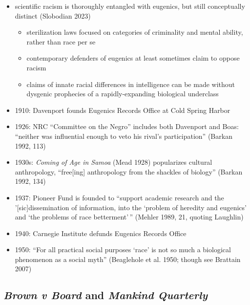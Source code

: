 \documentclass[12pt]{article}
\providecommand{\tightlist}{%
  \setlength{\itemsep}{0pt}\setlength{\parskip}{0pt}}
\begin{document}
\begin{itemize}
\tightlist
\item
  scientific racism is thoroughly entangled with eugenics, but still
  conceptually distinct (Slobodian 2023)

  \begin{itemize}
  \tightlist
  \item
    sterilization laws focused on categories of criminality and mental
    ability, rather than race per se
  \item
    contemporary defenders of eugenics at least sometimes claim to
    oppose racism
  \item
    claims of innate racial differences in intelligence can be made
    without dysgenic prophecies of a rapidly-expanding biological
    underclass
  \end{itemize}
\item
  1910: Davenport founds Eugenics Records Office at Cold Spring Harbor
\item
  1926: NRC ``Committee on the Negro'' includes both Davenport and Boas:
  ``neither was influential enough to veto his rival's participation''
  (Barkan 1992, 113)
\item
  1930s: \emph{Coming of Age in Samoa} (Mead 1928) popularizes cultural
  anthropology, ``free{[}ing{]} anthropology from the shackles of
  biology'' (Barkan 1992, 134)
\item
  1937: Pioneer Fund is founded to ``support academic research and the
  '{[}sic{]}dissemination of information, into the `problem of heredity
  and eugenics' and `the problems of race betterment'\,'' (Mehler 1989,
  21, quoting Laughlin)
\item
  1940: Carnegie Institute defunds Eugenics Records Office
\item
  1950: ``For all practical social purposes `race' is not so much a
  biological phenomenon as a social myth'' (Beaglehole et al. 1950;
  though see Brattain 2007)
\end{itemize}

\hypertarget{brown-v-board-and-mankind-quarterly}{%
\subsection*{\texorpdfstring{\emph{Brown v Board} and \emph{Mankind
Quarterly}}{Brown v Board and Mankind Quarterly}}\label{brown-v-board-and-mankind-quarterly}}
\end{document}
